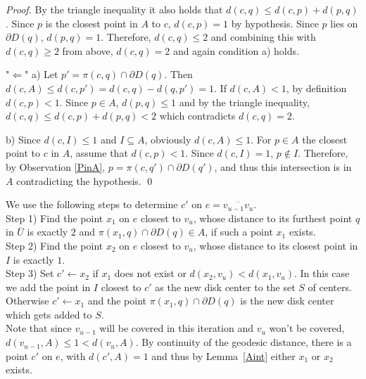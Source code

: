 \documentclass{llncs}
\begin{document}
\begin{proof}
By the triangle inequality it also holds that $d(c, q) \leq d(c, p) + d(p, q)$. Since $p$ is the closest point in $A$ to $c$, $d(c,p) = 1$ by hypothesis. Since $p$ lies on $\partial D(q)$, $d(p,q) = 1$. Therefore,  $d(c, q) \leq 2$ and combining this with $d(c,q) \geq 2$ from above, $d(c, q) = 2$ and again condition a) holds.

\noindent "$\Leftarrow$"
\noindent a) Let $p' = \pi(c,q) \cap \partial D(q)$.  Then $d(c, A) \leq d(c, p') = d(c, q) - d(q, p') = 1$.  If $d(c,A) < 1$, by definition $d(c,p) < 1$. Since $p \in A$, $d(p,q) \leq 1$ and by the triangle inequality, $d(c, q) \leq d(c, p) + d(p, q) < 2$ which contradicts $d(c, q) = 2$.

\noindent b) Since $d(c, I) \leq 1$ and $I \subseteq A$, obviously $d(c, A) \leq 1$.  For $p \in A$ the closest point to $c$ in $A$, assume that $d(c, p)< 1$.  Since $d(c, I) = 1$, $p \notin I$.  Therefore, by Observation \ref{PinA}, $p = \pi(c,q') \cap \partial D(q')$, and thus this intersection is in $A$ contradicting the hypothesis.
\qed
\end{proof}






We use the following steps to determine $c'$ on $e = \overline{v_{u-1}v_{u}}$.\\
Step 1)  Find the point $x_1$ on $e$ closest to $v_u$, whose distance to its furthest point $q$ in $\overline{U}$ is exactly $2$ and $\pi(x_1,q) \cap \partial D(q) \in A$, if such a point $x_1$ exists. \\
Step 2) Find the point $x_2$ on $e$ closest to $v_u$, whose distance to its closest point in $I$ is exactly $1$.  \\
Step 3) Set $c' \gets x_2$ if $x_1$ does not exist or $d(x_2,v_u) < d(x_1,v_u)$. In this case we add the point in $I$ closest to $c'$ as the new disk center to the set $S$ of centers. Otherwise $c' \gets x_1$ and the point $\pi(x_1,q) \cap \partial D(q)$ is the new disk center which gets added to $S$.\\ 



Note that since $v_{u-1}$ will be covered in this iteration and $v_{u}$ won't be covered, $d(v_{u-1}, A) \leq 1 < d(v_{u}, A)$. By continuity of the geodesic distance, there is a point $c'$ on $e$, with $d(c', A) = 1$ and thus by Lemma~\ref{Aint} either $x_1$ or $x_2$ exists.\\
\end{document}
